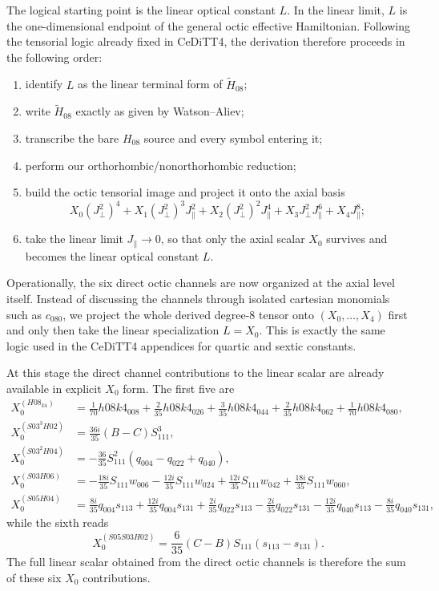 \documentclass[aip,jcp,reprint,floatfix]{revtex4-2}
\begin{document}
The logical starting point is the linear optical constant \(L\). In the linear
limit, \(L\) is the one-dimensional endpoint of the general octic effective
Hamiltonian. Following the tensorial logic already fixed in CeDiTT4, the
derivation therefore proceeds in the following order:
\begin{enumerate}
\item identify \(L\) as the linear terminal form of \(\tilde H_{08}\);
\item write \(\tilde H_{08}\) exactly as given by Watson--Aliev;
\item transcribe the bare \(H_{08}\) source and every symbol entering it;
\item perform our orthorhombic/nonorthorhombic reduction;
\item build the octic tensorial image and project it onto the axial basis
\[
X_0(J_\perp^2)^4+X_1(J_\perp^2)^3J_\parallel^2+X_2(J_\perp^2)^2J_\parallel^4
+X_3J_\perp^2J_\parallel^6+X_4J_\parallel^8;
\]
\item take the linear limit \(J_\parallel\to0\), so that only the axial scalar
\(X_0\) survives and becomes the linear optical constant \(L\).
\end{enumerate}

Operationally, the six direct octic channels are now organized at the axial
level itself. Instead of discussing the channels through isolated cartesian
monomials such as \(c_{080}\), we project the whole derived degree-8 tensor
onto \((X_0,\ldots,X_4)\) first and only then take the linear specialization
\(L=X_0\). This is exactly the same logic used in the CeDiTT4 appendices for
quartic and sextic constants.

At this stage the direct channel contributions to the linear scalar are already
available in explicit \(X_0\) form. The first five are
\begin{align}
X_0^{(H08_{k4})} &=
\frac{1}{70}h08k4_{008}
+\frac{2}{35}h08k4_{026}
+\frac{3}{35}h08k4_{044}
+\frac{2}{35}h08k4_{062}
+\frac{1}{70}h08k4_{080},
\\
X_0^{(S03^3H02)} &= \frac{36i}{35}(B-C)S_{111}^3,
\\
X_0^{(S03^2H04)} &= -\frac{36}{35}S_{111}^2(q_{004}-q_{022}+q_{040}),
\\
X_0^{(S03H06)} &=
-\frac{18i}{35}S_{111}w_{006}
-\frac{12i}{35}S_{111}w_{024}
+\frac{12i}{35}S_{111}w_{042}
+\frac{18i}{35}S_{111}w_{060},
\\
X_0^{(S05H04)} &=
\frac{8i}{35}q_{004}s_{113}
+\frac{12i}{35}q_{004}s_{131}
+\frac{2i}{35}q_{022}s_{113}
-\frac{2i}{35}q_{022}s_{131}
-\frac{12i}{35}q_{040}s_{113}
-\frac{8i}{35}q_{040}s_{131},
\end{align}
while the sixth reads
\begin{equation}
X_0^{(S05S03H02)}=
\frac{6}{35}(C-B)S_{111}(s_{113}-s_{131}).
\end{equation}
The full linear scalar obtained from the direct octic channels is therefore the
sum of these six \(X_0\) contributions.
\end{document}
